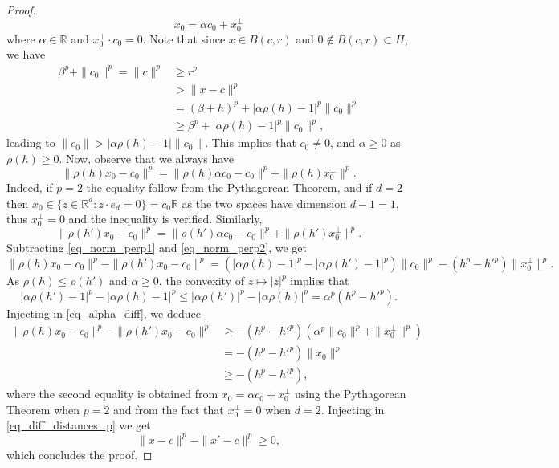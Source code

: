 \documentclass[a4paper, 11pt]{article}
\theoremstyle{plain}
\theoremstyle{definition}
\newcommand{\R}{\mathbb{R}}
\numberwithin{equation}{section}
\begin{document}
\begin{proof}
        \[x_0=\alpha c_0+x_0^{\perp}\]
    where $\alpha\in\R$ and $x_0^\perp\cdot c_0=0$. Note that since $x\in B(c, r)$ and $0\notin B(c, r)\subset H$, we have
        \begin{equation*}
            \begin{split}
                \beta^p+\|c_0\|^p=\|c\|^p&\geq r^p\\
                &>\|x-c\|^p\\
                &=(\beta+h)^p+|\alpha\rho(h)-1|^p\|c_0\|^p\\
                &\geq\beta^p+|\alpha\rho(h)-1|^p\|c_0\|^p,
            \end{split}
        \end{equation*}
    leading to $\|c_0\|>|\alpha\rho(h)-1|\|c_0\|$. This implies that $c_0\neq 0$, and $\alpha\geq 0$ as $\rho(h)\geq 0$. Now, observe that we always have
        \begin{equation}
            \label{eq_norm_perp1}
            \|\rho(h)x_0-c_0\|^p=\|\rho(h)\alpha c_0-c_0\|^p+\|\rho(h)x_0^\perp\|^p.
        \end{equation}
    Indeed, if $p=2$ the equality follow from the Pythagorean Theorem, and if $d=2$ then $x_0\in\{z\in\R^d:z\cdot e_d=0\}=c_0\R$ as the two spaces have dimension $d-1=1$, thus $x_0^\perp=0$ and the inequality is verified. Similarly,
        \begin{equation}
            \label{eq_norm_perp2}
            \|\rho(h')x_0-c_0\|^p=\|\rho(h')\alpha c_0-c_0\|^p+\|\rho(h')x_0^\perp\|^p.
        \end{equation}
    Subtracting \eqref{eq_norm_perp1} and \eqref{eq_norm_perp2}, we get
        \begin{equation}
            \label{eq_alpha_diff}
            \|\rho(h)x_0-c_0\|^p-\|\rho(h')x_0-c_0\|^p=(|\alpha\rho(h)-1|^p-|\alpha\rho(h')-1|^p)\|c_0\|^p-(h^p-h'^p)\|x_0^\perp\|^p.
        \end{equation}
    As $\rho(h)\leq\rho(h')$ and $\alpha\geq 0$, the convexity of $z\mapsto|z|^p$ implies that
        \[|\alpha\rho(h')-1|^p-|\alpha\rho(h)-1|^p\leq|\alpha\rho(h')|^p-|\alpha\rho(h)|^p=\alpha^p(h^p-{h'^p}).\]
    Injecting in \eqref{eq_alpha_diff}, we deduce
        \begin{equation*}
            \begin{split}
                \|\rho(h)x_0-c_0\|^p-\|\rho(h')x_0-c_0\|^p&\geq-(h^p-h'^p)(\alpha^p\|c_0\|^p+\|x_0^\perp\|^p)\\
                &=-(h^p-h'^p)\|x_0\|^p\\
                &\geq-(h^p-h'^p),
            \end{split}
        \end{equation*}
    where the second equality is obtained from $x_0=\alpha c_0+x_0^\perp$ using the Pythagorean Theorem when $p=2$ and from the fact that $x_0^\perp=0$ when $d=2$. Injecting in \eqref{eq_diff_distances_p} we get 
        \[\|x-c\|^p-\|x'-c\|^p\geq 0,\]
    which concludes the proof.
\end{proof}
\end{document}
